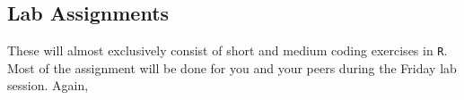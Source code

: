 \subsection*{Lab Assignments}

These will almost exclusively consist of short and medium coding exercises in \texttt{R}. Most of the assignment will be done for you and your peers during the Friday lab session. Again, 